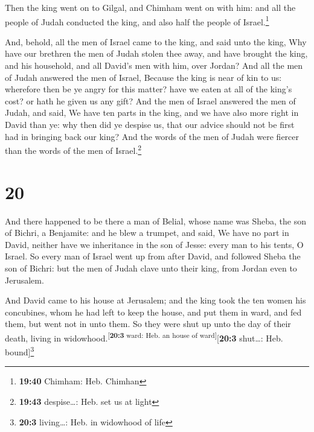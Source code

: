  Then the king went on to Gilgal, and Chimham went on
with him: and all the people of Judah conducted the king, and also half
the people of Israel.\footnote{\textbf{19:40} Chimham: Heb. Chimhan}

 And, behold, all the men of Israel came to the king, and
said unto the king, Why have our brethren the men of Judah stolen thee
away, and have brought the king, and his household, and all David's men
with him, over Jordan?  And all the men of Judah answered
the men of Israel, Because the king is near of kin to us: wherefore then
be ye angry for this matter? have we eaten at all of the king's cost? or
hath he given us any gift?  And the men of Israel
answered the men of Judah, and said, We have ten parts in the king, and
we have also more right in David than ye: why then did ye despise us,
that our advice should not be first had in bringing back our king? And
the words of the men of Judah were fiercer than the words of the men of
Israel.\footnote{\textbf{19:43} despise\ldots: Heb. set us at light}

\hypertarget{section-19}{%
\section{20}\label{section-19}}

 And there happened to be there a man of Belial, whose
name was Sheba, the son of Bichri, a Benjamite: and he blew a trumpet,
and said, We have no part in David, neither have we inheritance in the
son of Jesse: every man to his tents, O Israel.  So every
man of Israel went up from after David, and followed Sheba the son of
Bichri: but the men of Judah clave unto their king, from Jordan even to
Jerusalem.

 And David came to his house at Jerusalem; and the king
took the ten women his concubines, whom he had left to keep the house,
and put them in ward, and fed them, but went not in unto them. So they
were shut up unto the day of their death, living in
widowhood.\textsuperscript{{[}\textbf{20:3} ward: Heb. an house of
ward{]}}{[}\textbf{20:3} shut\ldots: Heb. bound{]}\footnote{\textbf{20:3}
  living\ldots: Heb. in widowhood of life}

